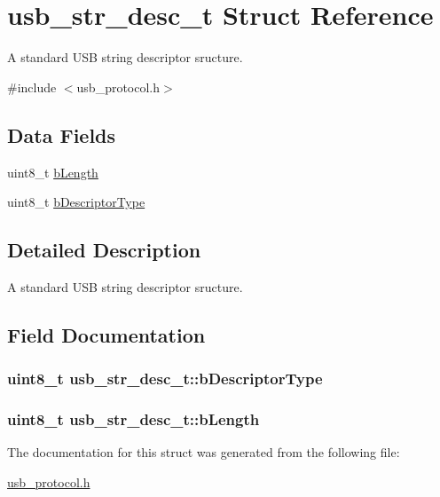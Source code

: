 \hypertarget{structusb__str__desc__t}{
\section{usb\-\_\-str\-\_\-desc\-\_\-t \-Struct \-Reference}
\label{structusb__str__desc__t}
}


\-A standard \-U\-S\-B string descriptor sructure.  




{\ttfamily \#include $<$usb\-\_\-protocol.\-h$>$}

\subsection*{\-Data \-Fields}
\begin{DoxyCompactItemize}
\item 
uint8\-\_\-t \hyperlink{structusb__str__desc__t_ab23ffbfabfea9cc57aec37cdb9122379}{b\-Length}
\item 
uint8\-\_\-t \hyperlink{structusb__str__desc__t_afaeec55a399403b5d683d63ed7be6117}{b\-Descriptor\-Type}
\end{DoxyCompactItemize}


\subsection{\-Detailed \-Description}
\-A standard \-U\-S\-B string descriptor sructure. 

\subsection{\-Field \-Documentation}
\hypertarget{structusb__str__desc__t_afaeec55a399403b5d683d63ed7be6117}{
\subsubsection[{b\-Descriptor\-Type}]{\setlength{\rightskip}{0pt plus 5cm}uint8\-\_\-t {\bf usb\-\_\-str\-\_\-desc\-\_\-t\-::b\-Descriptor\-Type}}}
\label{structusb__str__desc__t_afaeec55a399403b5d683d63ed7be6117}
\hypertarget{structusb__str__desc__t_ab23ffbfabfea9cc57aec37cdb9122379}{
\subsubsection[{b\-Length}]{\setlength{\rightskip}{0pt plus 5cm}uint8\-\_\-t {\bf usb\-\_\-str\-\_\-desc\-\_\-t\-::b\-Length}}}
\label{structusb__str__desc__t_ab23ffbfabfea9cc57aec37cdb9122379}


\-The documentation for this struct was generated from the following file\-:\begin{DoxyCompactItemize}
\item 
\hyperlink{usb__protocol_8h}{usb\-\_\-protocol.\-h}\end{DoxyCompactItemize}
